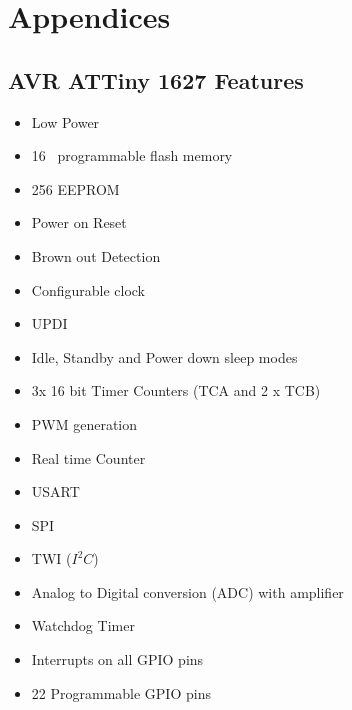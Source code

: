 \documentclass[11pt,a4paper,titlepage]{report}
\begin{document}
	\chapter*{Appendices}
	\section{AVR ATTiny 1627 Features}\label{appendix:attiny_features}
	\begin{itemize}
		\item Low Power
		\item 16\unit{\kilo\byte} programmable flash memory
		\item 256\unit{\byte} EEPROM
		\item Power on Reset
		\item Brown out Detection
		\item Configurable clock
		\item UPDI
		\item Idle, Standby and Power down sleep modes
		\item 3x 16 bit Timer Counters (TCA and 2 x TCB)
		\item PWM generation
		\item Real time Counter
		\item USART
		\item SPI
		\item TWI ($I^{2}C$)
		\item Analog to Digital conversion (ADC) with amplifier
		\item Watchdog Timer
		\item Interrupts on all GPIO pins
		\item 22 Programmable GPIO pins
	\end{itemize}
	
\end{document}
